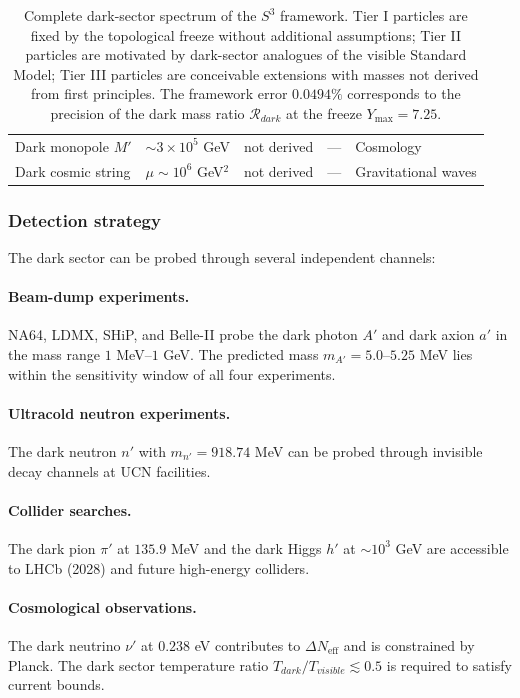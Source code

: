 \documentclass[a4paper,7pt,oneside,openany]{book}
\begin{document}
\begin{table}[htbp]
\begin{tabular}{@{}p{}p{}p{}p{}p{}@{}}
Dark monopole $M'$ & $\sim 3\times 10^{5}$ GeV & not derived & --- & Cosmology \\
Dark cosmic string & $\mu\sim 10^{6}$ GeV$^{2}$ & not derived & --- & Gravitational waves \\
\bottomrule
\end{tabular}
\caption{Complete dark-sector spectrum of the $S^{3}$ framework. 
Tier I particles are fixed by the topological freeze without 
additional assumptions; Tier II particles are motivated by 
dark-sector analogues of the visible Standard Model; Tier III 
particles are conceivable extensions with masses not derived 
from first principles. The framework error $0.0494\%$ corresponds 
to the precision of the dark mass ratio $\mathcal{R}_{dark}$ at 
the freeze $Y_{\max}=7.25$.}
\label{tab:dark-spectrum}
\end{table}

\subsubsection{Detection strategy}

The dark sector can be probed through several independent 
channels:

\paragraph{Beam-dump experiments.}
NA64, LDMX, SHiP, and Belle-II probe the dark photon $A'$ and 
dark axion $a'$ in the mass range $1$ MeV--$1$ GeV. The 
predicted mass $m_{A'}=5.0$--$5.25$ MeV lies within the 
sensitivity window of all four experiments.

\paragraph{Ultracold neutron experiments.}
The dark neutron $n'$ with $m_{n'}=918.74$ MeV can be probed 
through invisible decay channels at UCN facilities.

\paragraph{Collider searches.}
The dark pion $\pi'$ at $135.9$ MeV and the dark Higgs $h'$ at 
$\sim 10^{3}$ GeV are accessible to LHCb (2028) and future 
high-energy colliders.

\paragraph{Cosmological observations.}
The dark neutrino $\nu'$ at $0.238$ eV contributes to 
$\Delta N_{\text{eff}}$ and is constrained by Planck. The dark 
sector temperature ratio $T_{dark}/T_{visible}\lesssim 0.5$ is 
required to satisfy current bounds.
\end{document}
